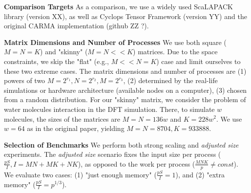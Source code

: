 \documentclass[sigplan,review,anonymous]{acmart}\settopmatter{printfolios=true,printccs=false,printacmref=false}
\newcommand\mac[1]{\textcolor{red}{[Mac: #1]}}
\newcommand{\macb}[1]{\textbf{\textsf{#1}}}
\begin{document}

\macb{Comparison Targets}
%
As a comparison, we use a widely used ScaLAPACK library (version XX), as well 
as Cyclops Tensor Framework (version YY) and the original CARMA implementation 
(github ZZ ?).

\macb{Matrix Dimensions and Number of Processes}
We use both square ($M = N = K$) and "skinny" ($M = N << K$) matrices. Due to 
the space constraints, we skip the "flat" (e.g., $M << N = K$) case and limit 
ourselves to these two extreme cases. The matrix dimensions and number of 
processes are (1) powers of 
two $M = 2^{r_1}, N = 2^{r_2}, M = 2^{r_3}$, (2) determined by the real-life 
simulations or hardware architecture (available nodes on a computer), (3) 
chosen from a random distribution. 
For our "skinny" matrix, we consider the problem of 
water 
molecules interaction in the DFT
simulation\cite{joost}. There, to simulate $w$ molecules, the sizes 
of the 
matrices are $M=N=136w$ and $K = 228w^2$. We use $w=64$ as in the 
original paper, yielding $M=N=8704, K = 933888$.

\macb{Selection of Benchmarks}
%
We perform both strong scaling and \emph{adjusted size} experiments. 
The \emph{adjusted size} scenario fixes the input size per process 
($\frac{pS}{I}, I = MN + MK + NK$), as opposed to the work per 
process ($\frac{MNK}{p} \ne const$). We evaluate two cases: (1) "just enough 
memory" ($\frac{pS}{I} = 1$), and (2) "extra memory"  ($\frac{pS}{I} = 
p^{1/3}$).
%
%
%
\end{document}
